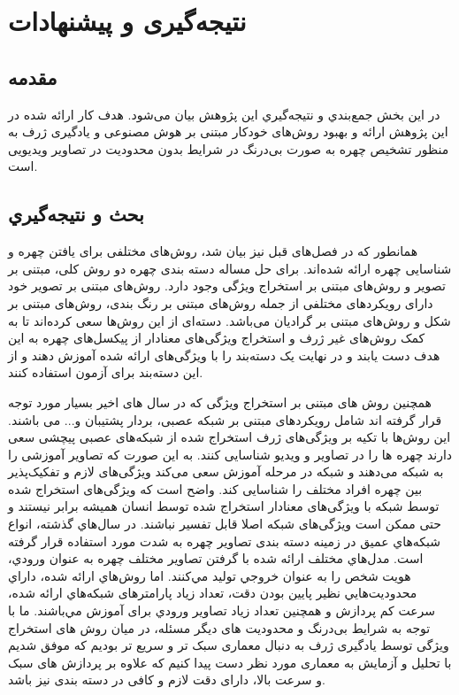 \chapter{نتیجه‌گیری و پیشنهادات}

\section{مقدمه}
در اين بخش جمع‌بندي و نتيجه‌گيري اين پژوهش بيان می‌شود. هدف کار ارائه شده در این پژوهش ارائه و بهبود روش‌های خودکار مبتنی بر هوش مصنوعی و یادگیری ژرف به منظور تشخیص چهره به صورت بی‌درنگ در شرایط بدون محدودیت در تصاویر ویدیویی است‌‌‌. 

\section{بحث و نتيجه‌گيري}
همانطور که در فصل‌های قبل نیز بیان شد، روش‌های مختلفی برای یافتن چهره و شناسایی چهره ارائه شده‌اند. برای حل مساله دسته ‌بندی چهره دو روش کلی، مبتنی بر تصویر و روش‌های مبتنی بر استخراج ویژگی وجود دارد. روش‌های مبتنی بر تصویر خود دارای رویکردهای مختلفی از جمله روش‌های مبتنی بر رنگ‌ بندی، روش‌های مبتنی بر شکل و روش‌های مبتنی بر گرادیان می‌باشد. دسته‌ای از این روش‌ها سعی کرده‌اند تا به کمک روش‌های غیر ژرف و استخراج ویژگی‌های معنادار از پیکسل‌های چهره به این هدف دست یابند‌ و در نهایت یک دسته‌بند را با ویژگی‌های ارائه شده آموزش دهند و از این دسته‌بند برای آزمون استفاده کنند. 

\noindent
همچنین روش های مبتنی بر استخراج ویژگی که در سال های اخیر بسیار مورد توجه قرار گرفته اند شامل رویکردهای مبتنی بر شبکه عصبی، بردار پشتیبان و... می باشند. این روش‌ها با تکیه بر ویژگی‌های ژرف استخراج شده از شبکه‌های عصبی پیچشی سعی دارند چهره ‌ها را در تصاویر و ویدیو شناسایی کنند. به این صورت که تصاویر آموزشی را به شبکه می‌دهند و شبکه در مرحله آموزش سعی می‌کند ویژگی‌های لازم و تفکیک‌پذیر بین چهره افراد مختلف ‌‌را شناسایی کند. واضح است که ویژگی‌های استخراج شده توسط شبکه با ویژگی‌های معنادار استخراج شده توسط انسان همیشه برابر نیستند و حتی ممکن است ویژگی‌های شبکه اصلا قابل تفسیر نباشند.
\noindent
در سال‌هاي گذشته، انواع شبكه‌هاي عميق در زمينه دسته بندی تصاوير چهره به شدت مورد استفاده قرار گرفته است. مدل‌هاي مختلف ارائه شده با گرفتن تصاوير مختلف چهره به عنوان ورودي، هویت شخص را به عنوان خروجي توليد مي‌كنند. اما روش‌هاي ارائه شده، داراي محدوديت‌هايي نظير پايين بودن دقت، تعداد زیاد پارامترهای شبكه‌هاي ارائه شده، سرعت کم پردازش و همچنين تعداد زياد تصاوير ورودي برای آموزش مي‌باشند. ما با توجه به شرایط بی‌درنگ و محدودیت های دیگر مسئله، در میان روش های استخراج ویژگی توسط یادگیری ژرف به دنبال معماری سبک تر و سریع تر بودیم که موفق شدیم با تحلیل و آزمایش به معماری مورد نظر دست پیدا کنیم که علاوه بر پردازش های سبک و سرعت بالا، دارای دقت لازم و کافی در دسته بندی نیز باشد.

